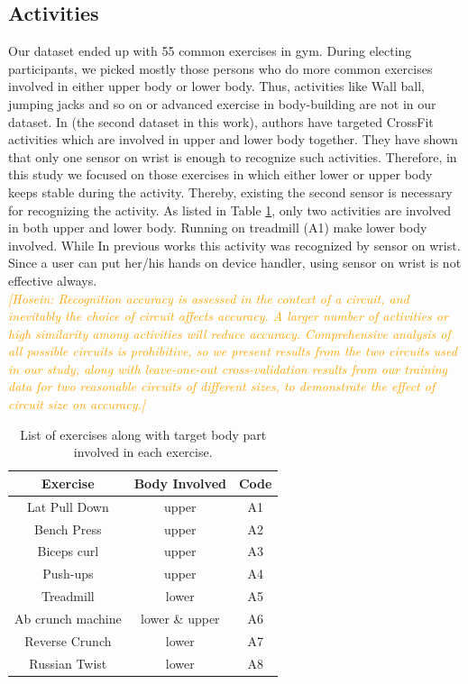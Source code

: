 \documentclass[journal,article,submit,moreauthors,pdftex]{Definitions/mdpi}
\newcommand{\hosein}[1]{\textcolor{orange}{{\it [Hosein: #1]}}}
\begin{document}
\subsection{Activities}
Our dataset ended up with 55 common exercises in gym. During electing participants, we picked mostly those persons who do more common exercises involved in either upper body or lower body. Thus, activities like Wall ball, jumping jacks and so on or advanced exercise in body-building are not in our dataset. In \cite{soro2019recognition} (the second dataset in this work), authors have targeted CrossFit activities which are involved in upper and lower body together. They have shown that only one sensor on wrist is enough to recognize such activities. Therefore, in this study we focused on those exercises in which either lower or upper body keeps stable during the activity. Thereby, existing the second sensor is necessary for recognizing the activity. As listed in Table \ref{activity_list}, only two activities are involved in both upper and lower body. Running on treadmill (A1) make lower body involved. While In previous works this activity was recognized by sensor on wrist. Since a user can put her/his hands on device handler, using sensor on wrist is not effective always. \\
\hosein{Recognition accuracy is assessed in the context of a circuit, and inevitably the choice of circuit affects accuracy. A larger number of activities or high similarity among activities will reduce accuracy. Comprehensive analysis of all possible circuits is prohibitive, so we present results from the two circuits used in our study, along with leave-one-out cross-validation results from our training data for two reasonable circuits of different sizes, to demonstrate the effect of circuit size on accuracy.}
\begin{table}[H]
	\caption{List of exercises along with target body part involved in each exercise.}
	\centering
	\begin{tabular}{ccc}
		\toprule
		\textbf{Exercise}	& \textbf{Body Involved}	& \textbf{Code}\\
		\midrule
		Lat Pull Down		& upper 		& A1\\
		Bench Press		& upper 			& A2\\
		Biceps curl		& upper			& A3\\
		Push-ups & upper			& A4\\
		Treadmill		& lower 			& A5\\
		Ab crunch machine		& lower \& upper & A6\\
		Reverse Crunch & lower			& A7 \\
		Russian Twist & lower			& A8 \\
		\bottomrule
	\end{tabular}
\label{activity_list}
\end{table}
\end{document}
